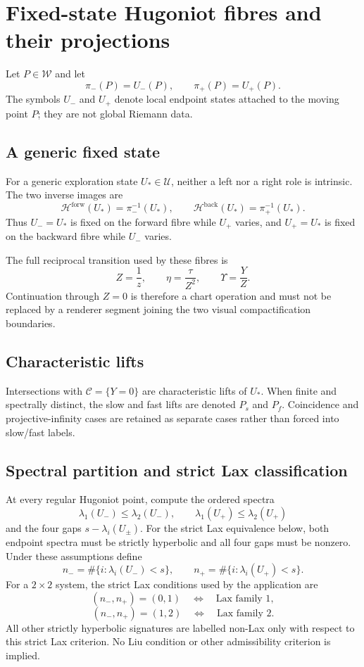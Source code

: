\section{Fixed-state Hugoniot fibres and their projections}
\label{sec:hugoniot}

Let $P\in\mathcal W$ and let
\[
  \pi_-(P)=U_-(P),\qquad \pi_+(P)=U_+(P).
\]
The symbols $U_-$ and $U_+$ denote local endpoint states attached to the moving point $P$; they are not global Riemann data.

\subsection{A generic fixed state}
For a generic exploration state $U_*\in\mathcal U$, neither a left nor a right role is intrinsic.  The two inverse images are
\[
 \mathcal H^{\mathrm{forw}}(U_*)=\pi_-^{-1}(U_*),\qquad
 \mathcal H^{\mathrm{back}}(U_*)=\pi_+^{-1}(U_*).
\]
Thus $U_-=U_*$ is fixed on the forward fibre while $U_+$ varies, and $U_+=U_*$ is fixed on the backward fibre while $U_-$ varies.

The full reciprocal transition used by these fibres is
\[
 Z=\frac1z,\qquad \eta=\frac{\tau}{Z^2},\qquad
 \Upsilon=\frac{Y}{Z}.
\]
Continuation through $Z=0$ is therefore a chart operation and must not be replaced by a renderer segment joining the two visual compactification boundaries.

\subsection{Characteristic lifts}
Intersections with $\mathcal C=\{Y=0\}$ are characteristic lifts of $U_*$.  When finite and spectrally distinct, the slow and fast lifts are denoted $P_s$ and $P_f$.  Coincidence and projective-infinity cases are retained as separate cases rather than forced into slow/fast labels.

\subsection{Spectral partition and strict Lax classification}
At every regular Hugoniot point, compute the ordered spectra
\[
 \lambda_1(U_-)\leq\lambda_2(U_-),\qquad
 \lambda_1(U_+)\leq\lambda_2(U_+)
\]
and the four gaps $s-\lambda_i(U_\pm)$.  For the strict Lax equivalence below,
both endpoint spectra must be strictly hyperbolic and all four gaps must be
nonzero.  Under these assumptions define
\[
 n_-=\#\{i:\lambda_i(U_-)<s\},\qquad
 n_+=\#\{i:\lambda_i(U_+)<s\}.
\]
For a $2\times2$ system, the strict Lax conditions used by the application are
\[
 (n_-,n_+)=(0,1)\quad\Longleftrightarrow\quad\text{Lax family 1},
\]
\[
 (n_-,n_+)=(1,2)\quad\Longleftrightarrow\quad\text{Lax family 2}.
\]
All other strictly hyperbolic signatures are labelled non-Lax only with respect to this strict Lax criterion.  No Liu condition or other admissibility criterion is implied.

